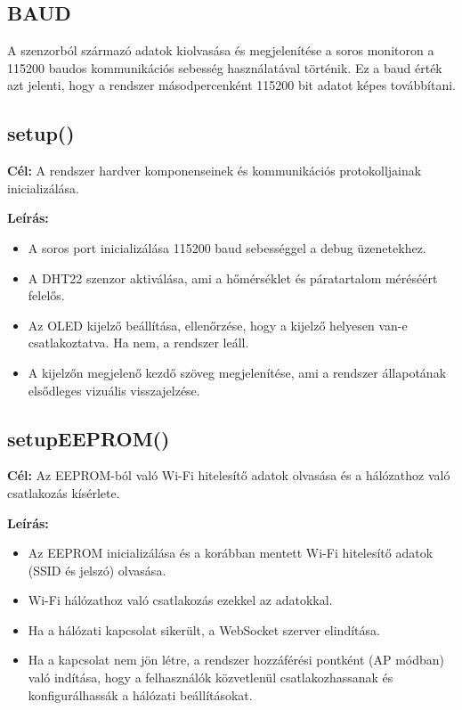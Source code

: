 \subsection{BAUD}
A szenzorból származó adatok kiolvasása és megjelenítése a soros monitoron a 115200 baudos kommunikációs sebesség használatával történik. Ez a baud érték azt jelenti, hogy a rendszer másodpercenként 115200 bit adatot képes továbbítani.

\subsection{setup()}
\textbf{Cél:} A rendszer hardver komponenseinek és kommunikációs protokolljainak inicializálása.

\textbf{Leírás:}
\begin{itemize}
  \item A soros port inicializálása 115200 baud sebességgel a debug üzenetekhez.
  \item A DHT22 szenzor aktiválása, ami a hőmérséklet és páratartalom méréséért felelős.
  \item Az OLED kijelző beállítása, ellenőrzése, hogy a kijelző helyesen van-e csatlakoztatva. Ha nem, a rendszer leáll.
  \item A kijelzőn megjelenő kezdő szöveg megjelenítése, ami a rendszer állapotának elsődleges vizuális visszajelzése.
\end{itemize}

\subsection{setupEEPROM()}
\textbf{Cél:} Az EEPROM-ból való Wi-Fi hitelesítő adatok olvasása és a hálózathoz való csatlakozás kísérlete.

\textbf{Leírás:}
\begin{itemize}
  \item Az EEPROM inicializálása és a korábban mentett Wi-Fi hitelesítő adatok (SSID és jelszó) olvasása.
  \item Wi-Fi hálózathoz való csatlakozás ezekkel az adatokkal.
  \item Ha a hálózati kapcsolat sikerült, a WebSocket szerver elindítása.
  \item Ha a kapcsolat nem jön létre, a rendszer hozzáférési pontként (AP módban) való indítása, hogy a felhasználók közvetlenül csatlakozhassanak és konfigurálhassák a hálózati beállításokat.
\end{itemize}

